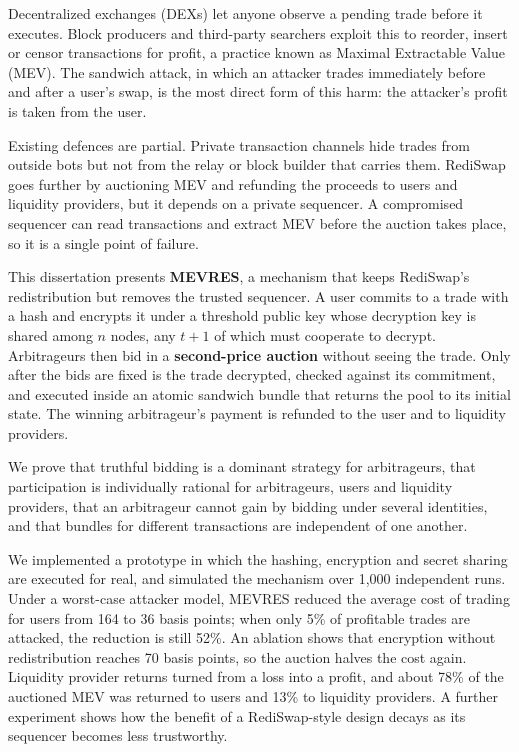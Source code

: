 Decentralized exchanges (DEXs) let anyone observe a pending trade before it executes. Block producers and third-party searchers exploit this to reorder, insert or censor transactions for profit, a practice known as Maximal Extractable Value (MEV). The sandwich attack, in which an attacker trades immediately before and after a user's swap, is the most direct form of this harm: the attacker's profit is taken from the user.

Existing defences are partial. Private transaction channels hide trades from outside bots but not from the relay or block builder that carries them. RediSwap goes further by auctioning MEV and refunding the proceeds to users and liquidity providers, but it depends on a private sequencer. A compromised sequencer can read transactions and extract MEV before the auction takes place, so it is a single point of failure.

This dissertation presents \textbf{MEVRES}, a mechanism that keeps RediSwap's redistribution but removes the trusted sequencer. A user commits to a trade with a hash and encrypts it under a threshold public key whose decryption key is shared among $n$ nodes, any $t+1$ of which must cooperate to decrypt. Arbitrageurs then bid in a \textbf{second-price auction} without seeing the trade. Only after the bids are fixed is the trade decrypted, checked against its commitment, and executed inside an atomic sandwich bundle that returns the pool to its initial state. The winning arbitrageur's payment is refunded to the user and to liquidity providers.

We prove that truthful bidding is a dominant strategy for arbitrageurs, that participation is individually rational for arbitrageurs, users and liquidity providers, that an arbitrageur cannot gain by bidding under several identities, and that bundles for different transactions are independent of one another.

We implemented a prototype in which the hashing, encryption and secret sharing are executed for real, and simulated the mechanism over 1{,}000 independent runs. Under a worst-case attacker model, MEVRES reduced the average cost of trading for users from 164 to 36 basis points; when only 5\% of profitable trades are attacked, the reduction is still 52\%. An ablation shows that encryption without redistribution reaches 70 basis points, so the auction halves the cost again. Liquidity provider returns turned from a loss into a profit, and about 78\% of the auctioned MEV was returned to users and 13\% to liquidity providers. A further experiment shows how the benefit of a RediSwap-style design decays as its sequencer becomes less trustworthy.

